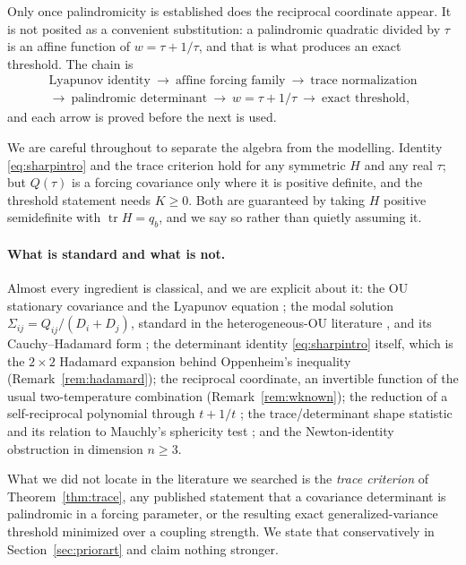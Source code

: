 \documentclass[11pt]{article}
\theoremstyle{plain}
\theoremstyle{definition}
\theoremstyle{remark}
\newcommand{\tr}{\operatorname{tr}}
\newcommand{\Sig}{\Sigma}
\begin{document}
Only once palindromicity is established does the reciprocal coordinate appear. It is not posited
as a convenient substitution: a palindromic quadratic divided by $\tau$ is an affine function of
$w=\tau+1/\tau$, and that is what produces an exact threshold. The chain is
\[
\begin{gathered}
  \text{Lyapunov identity}\ \to\ \text{affine forcing family}\ \to\ \text{trace normalization}\\
  \to\ \text{palindromic determinant}\ \to\ w=\tau+1/\tau\ \to\ \text{exact threshold},
\end{gathered}
\]
and each arrow is proved before the next is used.

We are careful throughout to separate the algebra from the modelling. Identity
\eqref{eq:sharpintro} and the trace criterion hold for any symmetric $H$ and any real $\tau$;
but $Q(\tau)$ is a forcing covariance only where it is positive definite, and the threshold
statement needs $K\ge0$. Both are guaranteed by taking $H$ positive semidefinite with
$\tr H=q_b$, and we say so rather than quietly assuming it.

\paragraph{What is standard and what is not.} Almost every ingredient is classical, and we are
explicit about it: the OU stationary covariance and the Lyapunov equation \cite{Gardiner2004};
the modal solution $\Sig_{ij}=Q_{ij}/(D_i+D_j)$, standard in the heterogeneous-OU literature
\cite{Barucca2014,GodrecheLuck2019}, and its Cauchy--Hadamard form
\cite{PalittaLefteriu2022,YadykinEtAl2023}; the determinant identity \eqref{eq:sharpintro}
itself, which is the $2\times2$ Hadamard expansion behind Oppenheim's inequality
(Remark~\ref{rem:hadamard}); the reciprocal coordinate, an invertible function of the usual
two-temperature combination (Remark~\ref{rem:wknown}); the reduction of a self-reciprocal
polynomial through $t+1/t$ \cite{Vieira2019}; the trace/determinant shape statistic and its
relation to Mauchly's sphericity test \cite{Mauchly1940,Muirhead1982}; and the Newton-identity
obstruction in dimension $n\ge3$.

What we did not locate in the literature we searched is the \emph{trace criterion} of
Theorem~\ref{thm:trace}, any published statement that a covariance determinant is palindromic in
a forcing parameter, or the resulting exact generalized-variance threshold minimized over a
coupling strength. We state that conservatively in Section~\ref{sec:priorart} and claim nothing
stronger.
\end{document}
